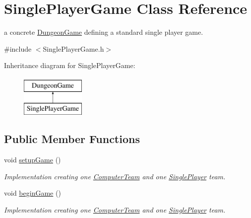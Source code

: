 \hypertarget{class_single_player_game}{}\section{Single\+Player\+Game Class Reference}
\label{class_single_player_game}


a concrete \hyperlink{class_dungeon_game}{Dungeon\+Game} defining a standard single player game.  




{\ttfamily \#include $<$Single\+Player\+Game.\+h$>$}

Inheritance diagram for Single\+Player\+Game\+:\begin{figure}[H]
\begin{center}
\leavevmode
\includegraphics[height=2.000000cm]{class_single_player_game}
\end{center}
\end{figure}
\subsection*{Public Member Functions}
\begin{DoxyCompactItemize}
\item 
\hypertarget{class_single_player_game_a4ba67eafea819b9d80b82b7e326c7a62}{}void \hyperlink{class_single_player_game_a4ba67eafea819b9d80b82b7e326c7a62}{setup\+Game} ()\label{class_single_player_game_a4ba67eafea819b9d80b82b7e326c7a62}

\begin{DoxyCompactList}\small\item\em Implementation creating one \hyperlink{class_computer_team}{Computer\+Team} and one \hyperlink{class_single_player}{Single\+Player} team. \end{DoxyCompactList}\item 
\hypertarget{class_single_player_game_af8a5aed5f4884a1ecca574d972248906}{}void \hyperlink{class_single_player_game_af8a5aed5f4884a1ecca574d972248906}{begin\+Game} ()\label{class_single_player_game_af8a5aed5f4884a1ecca574d972248906}

\begin{DoxyCompactList}\small\item\em Implementation creating one \hyperlink{class_computer_team}{Computer\+Team} and one \hyperlink{class_single_player}{Single\+Player} team. \end{DoxyCompactList}\end{DoxyCompactItemize}


